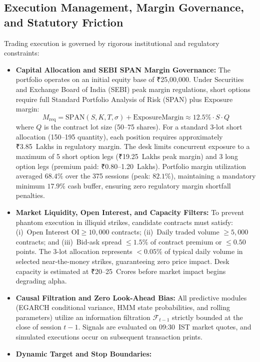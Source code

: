 \documentclass[journal]{IEEEtran}
\begin{document}
\subsection{Execution Management, Margin Governance, and Statutory Friction}
Trading execution is governed by rigorous institutional and regulatory constraints:
\begin{itemize}
    \item \textbf{Capital Allocation and SEBI SPAN Margin Governance:}
    The portfolio operates on an initial equity base of ₹25,00,000. Under Securities and Exchange Board of India (SEBI) peak margin regulations, short options require full Standard Portfolio Analysis of Risk (SPAN) plus Exposure margin:
    \begin{equation}
    M_{\mathrm{req}} = \mathrm{SPAN}(S, K, T, \sigma) + \mathrm{ExposureMargin} \approx 12.5\% \cdot S \cdot Q
    \end{equation}
    where $Q$ is the contract lot size (50--75 shares). For a standard 3-lot short allocation (150--195 quantity), each position requires approximately ₹3.85~Lakhs in regulatory margin. The desk limits concurrent exposure to a maximum of 5 short option legs (₹19.25~Lakhs peak margin) and 3 long option legs (premium paid: ₹0.80--1.20~Lakhs). Portfolio margin utilization averaged $68.4\%$ over the 375 sessions (peak: $82.1\%$), maintaining a mandatory minimum $17.9\%$ cash buffer, ensuring zero regulatory margin shortfall penalties.
    \item \textbf{Market Liquidity, Open Interest, and Capacity Filters:}
    To prevent phantom execution in illiquid strikes, candidate contracts must satisfy: (i)~Open Interest $\mathrm{OI} \ge 10{,}000$ contracts; (ii)~Daily traded volume $\ge 5{,}000$ contracts; and (iii)~Bid-ask spread $\le 1.5\%$ of contract premium or $\le 0.50$ points. The 3-lot allocation represents $<0.05\%$ of typical daily volume in selected near-the-money strikes, guaranteeing zero price impact. Desk capacity is estimated at ₹20--25~Crores before market impact begins degrading alpha.
    \item \textbf{Causal Filtration and Zero Look-Ahead Bias:}
    All predictive modules (EGARCH conditional variance, HMM state probabilities, and rolling parameters) utilize an information filtration $\mathcal{F}_{t-1}$ strictly bounded at the close of session $t-1$. Signals are evaluated on 09:30~IST market quotes, and simulated executions occur on subsequent transaction prints.
    \item \textbf{Dynamic Target and Stop Boundaries:}

\end{itemize}
\end{document}
